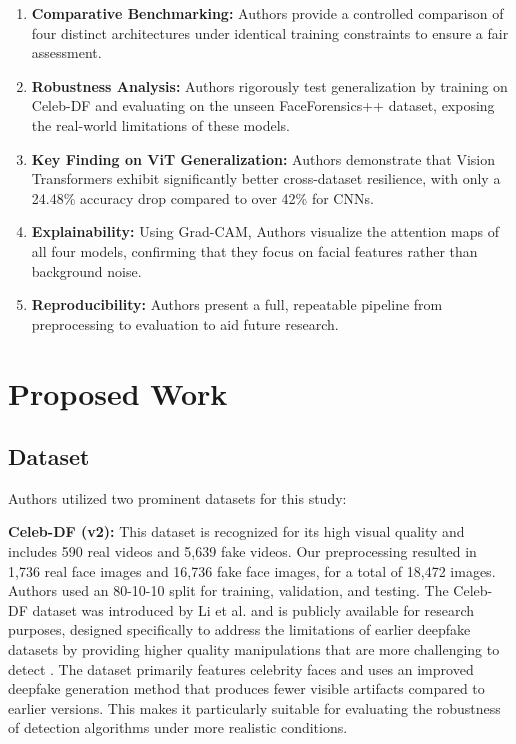 \documentclass[conference]{IEEEtran}
\begin{document}
\begin{enumerate}
    \item \textbf{Comparative Benchmarking:} Authors provide a controlled comparison of four distinct architectures under identical training constraints to ensure a fair assessment.

    \item \textbf{Robustness Analysis:} Authors rigorously test generalization by training on Celeb-DF and evaluating on the unseen FaceForensics++ dataset, exposing the real-world limitations of these models.

    \item \textbf{Key Finding on ViT Generalization:} Authors demonstrate that Vision Transformers exhibit significantly better cross-dataset resilience, with only a 24.48\% accuracy drop compared to over 42\% for CNNs.

    \item \textbf{Explainability:} Using Grad-CAM, Authors visualize the attention maps of all four models, confirming that they focus on facial features rather than background noise.

    \item \textbf{Reproducibility:} Authors present a full, repeatable pipeline from preprocessing to evaluation to aid future research.
\end{enumerate}

\section{Proposed Work}

\subsection{Dataset}
Authors utilized two prominent datasets for this study:

\textbf{Celeb-DF (v2):} This dataset is recognized for its high visual quality and includes 590 real videos and 5,639 fake videos. Our preprocessing resulted in 1,736 real face images and 16,736 fake face images, for a total of 18,472 images. Authors used an 80-10-10 split for training, validation, and testing. The Celeb-DF dataset was introduced by Li et al. and is publicly available for research purposes, designed specifically to address the limitations of earlier deepfake datasets by providing higher quality manipulations that are more challenging to detect \cite{cross_dataset}. The dataset primarily features celebrity faces and uses an improved deepfake generation method that produces fewer visible artifacts compared to earlier versions. This makes it particularly suitable for evaluating the robustness of detection algorithms under more realistic conditions.
\end{document}
